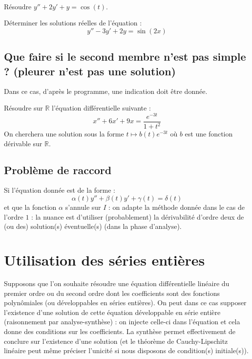 \documentclass[a4paper,10pt]{report}
\begin{document}
\newpage

$\phantom{test}$

\vspace{10cm}

\begin{ex} Résoudre $y''+2y'+y= \cos(t)$.

\vspace{10cm}
\end{ex}

\begin{exa} Déterminer les solutions réelles de l'équation :
  \[
   y'' - 3y' + 2y = \sin(2x)
  \]
\end{exa} 
\subsection{Que faire si le second membre n'est pas \og simple \fg ? (pleurer n'est pas une solution)}
\noindent Dans ce cas, d'après le programme, une indication doit être donnée.

\medskip

\begin{ex} Résoudre sur $\mathbb{R}$ l'équation différentielle suivante :
$$ x''+6x'+9x= \dfrac{e^{-3t}}{1+t^2}$$
On cherchera une solution sous la forme $t \mapsto b(t)e^{-3t}$ où $b$ est une fonction dérivable sur $\mathbb{R}$.

\vspace{11cm}
\end{ex}


\subsection{Problème de raccord}
\noindent Si l'équation donnée est de la forme :
$$ \alpha(t) y''+ \beta(t) y'+ \gamma(t) = \delta(t)$$
et que la fonction $\alpha$ s'annule sur $I$ : on adapte la méthode donnée dans le cas de l'ordre $1$ : la nuance est d'utiliser (probablement) la dérivabilité d'ordre deux de (ou des) solution(s) éventuelle(s) (dans la phase d'analyse).
\section{Utilisation des séries entières}
\noindent Supposons que l'on souhaite résoudre une équation différentielle linéaire du premier ordre ou du second ordre dont les coefficients sont des fonctions polynômiales (ou développables en séries entières). On peut dans ce cas supposer l'existence d'une solution de cette équation développable en série entière (raisonnement par analyse-synthèse) : on injecte celle-ci dans l'équation et cela donne des conditions sur les coefficients. La synthèse permet effectivement de conclure sur l'existence d'une solution (et le théorème de Cauchy-Lipschitz linéaire peut même préciser l'unicité si nous disposons de condition(s) initiale(s)).
\end{document}

